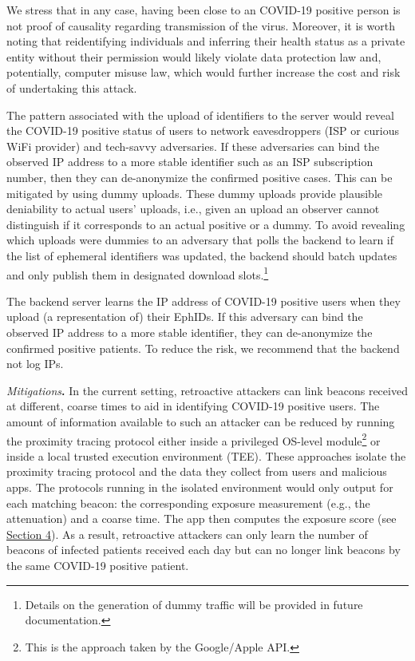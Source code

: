 \documentclass{article}
\begin{document}
We stress that in any case, having been close to an COVID-19 positive
person is not proof of causality regarding transmission of the virus.
Moreover, it is worth noting that reidentifying individuals and
inferring their health status as a private entity without their
permission would likely violate data protection law and, potentially,
computer misuse law, which would further increase the cost and risk of
undertaking this attack.

The pattern associated with the upload of identifiers to the server
would reveal the COVID-19 positive status of users to network
eavesdroppers (ISP or curious WiFi provider) and tech-savvy adversaries.
If these adversaries can bind the observed IP address to a more stable
identifier such as an ISP subscription number, then they can
de-anonymize the confirmed positive cases. This can be mitigated by
using dummy uploads. These dummy uploads provide plausible deniability
to actual users' uploads, i.e., given an upload an observer cannot
distinguish if it corresponds to an actual positive or a dummy. To avoid
revealing which uploads were dummies to an adversary that polls the
backend to learn if the list of ephemeral identifiers was updated, the
backend should batch updates and only publish them in designated
download slots.\footnote{Details on the generation of dummy traffic will
  be provided in future documentation.}

The backend server learns the IP address of COVID-19 positive users when
they upload (a representation of) their EphIDs. If this adversary can
bind the observed IP address to a more stable identifier, they can
de-anonymize the confirmed positive patients. To reduce the risk, we
recommend that the backend not log IPs.

\emph{Mitigations}\textbf{.} In the current setting, retroactive
attackers can link beacons received at different, coarse times to aid in
identifying COVID-19 positive users. The amount of information available
to such an attacker can be reduced by running the proximity tracing
protocol either inside a privileged OS-level module\footnote{This is the
  approach taken by the Google/Apple API.} or inside a local trusted
execution environment (TEE). These approaches isolate the proximity
tracing protocol and the data they collect from users and malicious
apps. The protocols running in the isolated environment would only
output for each matching beacon: the corresponding exposure measurement
(e.g., the attenuation) and a coarse time. The app then computes the
exposure score (see \protect\hyperlink{exposure-estimation}{{Section
4}}). As a result, retroactive attackers can only learn the number of
beacons of infected patients received each day but can no longer link
beacons by the same COVID-19 positive patient.
\end{document}
